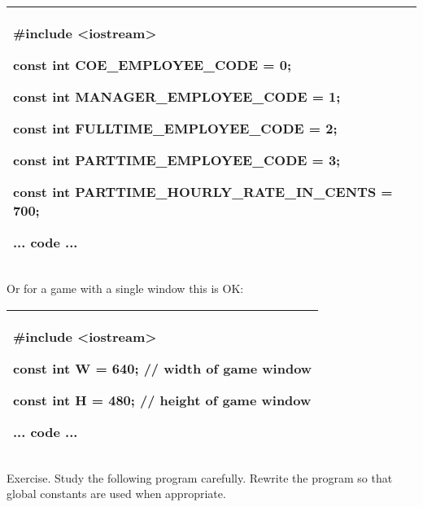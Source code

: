 \documentclass[
]{article}
\begin{document}
\begin{longtable}[]{@{}l@{}}
\toprule
\endhead
\begin{minipage}[t]{0.97\columnwidth}\raggedright
\#include \textless iostream\textgreater{}

const int COE\_EMPLOYEE\_CODE = 0;

const int MANAGER\_EMPLOYEE\_CODE = 1;

const int FULLTIME\_EMPLOYEE\_CODE = 2;

const int PARTTIME\_EMPLOYEE\_CODE = 3;

const int PARTTIME\_HOURLY\_RATE\_IN\_CENTS = 700;

... code ...\strut
\end{minipage}\tabularnewline
\bottomrule
\end{longtable}

Or for a game with a single window this is OK:

\begin{longtable}[]{@{}l@{}}
\toprule
\endhead
\begin{minipage}[t]{0.97\columnwidth}\raggedright
\#include \textless iostream\textgreater{}

const int W = 640; // width of game window

const int H = 480; // height of game window

... code ...\strut
\end{minipage}\tabularnewline
\bottomrule
\end{longtable}

Exercise. Study the following program carefully. Rewrite the program so
that global constants are used when appropriate.
\end{document}

